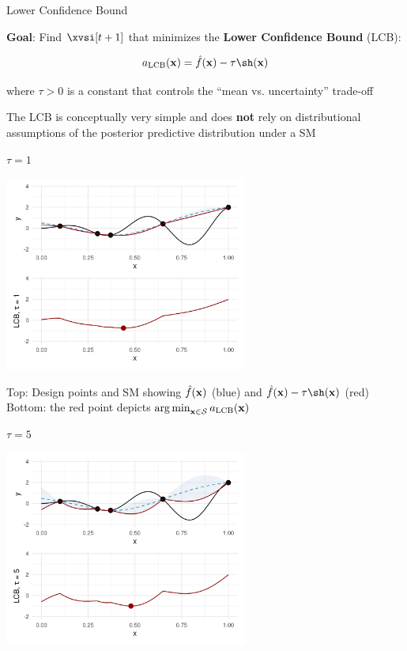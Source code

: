 \documentclass[11pt,compress,t,notes=noshow, xcolor=table]{beamer}
\begin{document}
\begin{vbframe}{Lower Confidence Bound}

\textbf{Goal}: Find $\xvsi[t+1]$ that minimizes the \textbf{Lower Confidence Bound} (LCB):

$$
  a_{\text{LCB}}(\xv) = \fh(\xv) - \tau \sh(\xv)
$$

where $\tau > 0$ is a constant that controls the \enquote{mean vs. uncertainty} trade-off\\

\vspace{1em}

The LCB is conceptually very simple and does \textbf{not} rely on distributional assumptions of the posterior predictive distribution under a SM

\framebreak

$\tau = 1$

\begin{center}
  \includegraphics[width = 0.6\textwidth]{figure_man/bayesian_loop_lcb_0.png}
\end{center}

Top: Design points and SM showing $\hat{f}(\mathbf{x})$ (blue) and $\fh(\xv) - \tau \sh(\xv)$ (red)\\
Bottom: the red point depicts $\operatorname*{arg\,min}_{\mathbf{x} \in \mathcal{S}} a_{\text{LCB}}(\mathbf{x})$

\framebreak

$\tau = 5$

\begin{center}
  \includegraphics[width = 0.6\textwidth]{figure_man/bayesian_loop_lcb_1.png}
\end{center}


\end{vbframe}
\end{document}
